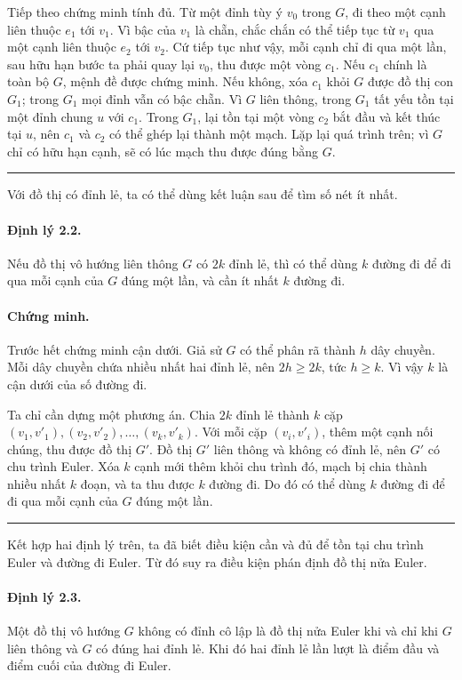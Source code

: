 \documentclass[11pt]{article}
\newcommand{\qedmark}{\hfill\rule{0.7ex}{0.7ex}}
\begin{document}
Tiếp theo chứng minh tính đủ. Từ một đỉnh tùy ý \(v_0\) trong \(G\), đi theo
một cạnh liên thuộc \(e_1\) tới \(v_1\). Vì bậc của \(v_1\) là chẵn, chắc chắn
có thể tiếp tục từ \(v_1\) qua một cạnh liên thuộc \(e_2\) tới \(v_2\). Cứ tiếp
tục như vậy, mỗi cạnh chỉ đi qua một lần, sau hữu hạn bước ta phải quay lại
\(v_0\), thu được một vòng \(c_1\). Nếu \(c_1\) chính là toàn bộ \(G\), mệnh đề
được chứng minh. Nếu không, xóa \(c_1\) khỏi \(G\) được đồ thị con \(G_1\);
trong \(G_1\) mọi đỉnh vẫn có bậc chẵn. Vì \(G\) liên thông, trong \(G_1\) tất
yếu tồn tại một đỉnh chung \(u\) với \(c_1\). Trong \(G_1\), lại tồn tại một
vòng \(c_2\) bắt đầu và kết thúc tại \(u\), nên \(c_1\) và \(c_2\) có thể ghép
lại thành một mạch. Lặp lại quá trình trên; vì \(G\) chỉ có hữu hạn cạnh, sẽ có
lúc mạch thu được đúng bằng \(G\). \qedmark

Với đồ thị có đỉnh lẻ, ta có thể dùng kết luận sau để tìm số nét ít nhất.

\paragraph{Định lý 2.2.}
Nếu đồ thị vô hướng liên thông \(G\) có \(2k\) đỉnh lẻ, thì có thể dùng \(k\)
đường đi để đi qua mỗi cạnh của \(G\) đúng một lần, và cần ít nhất \(k\) đường
đi.

\paragraph{Chứng minh.}
Trước hết chứng minh cận dưới. Giả sử \(G\) có thể phân rã thành \(h\) dây
chuyền. Mỗi dây chuyền chứa nhiều nhất hai đỉnh lẻ, nên \(2h\ge 2k\), tức
\(h\ge k\). Vì vậy \(k\) là cận dưới của số đường đi.

Ta chỉ cần dựng một phương án. Chia \(2k\) đỉnh lẻ thành \(k\) cặp
\((v_1,v'_1),(v_2,v'_2),\ldots,(v_k,v'_k)\). Với mỗi cặp \((v_i,v'_i)\), thêm
một cạnh nối chúng, thu được đồ thị \(G'\). Đồ thị \(G'\) liên thông và không
có đỉnh lẻ, nên \(G'\) có chu trình Euler. Xóa \(k\) cạnh mới thêm khỏi chu
trình đó, mạch bị chia thành nhiều nhất \(k\) đoạn, và ta thu được \(k\) đường
đi. Do đó có thể dùng \(k\) đường đi để đi qua mỗi cạnh của \(G\) đúng một lần.
\qedmark

Kết hợp hai định lý trên, ta đã biết điều kiện cần và đủ để tồn tại chu trình
Euler và đường đi Euler. Từ đó suy ra điều kiện phán định đồ thị nửa Euler.

\paragraph{Định lý 2.3.}
Một đồ thị vô hướng \(G\) không có đỉnh cô lập là đồ thị nửa Euler khi và chỉ
khi \(G\) liên thông và \(G\) có đúng hai đỉnh lẻ. Khi đó hai đỉnh lẻ lần lượt
là điểm đầu và điểm cuối của đường đi Euler.
\end{document}
